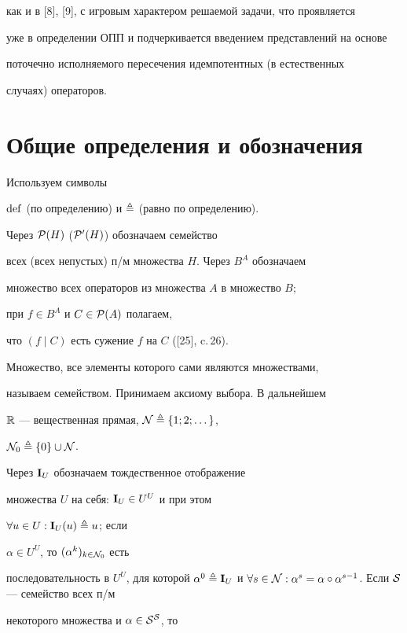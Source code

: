 как и в [8], [9], с игровым характером решаемой задачи, что проявляется


уже в определении ОПП и подчеркивается введением представлений на основе


поточечно исполняемого пересечения идемпотентных (в естественных


случаях) операторов.





\section{Общие определения и обозначения}





Используем символы


$\operatorname{def}$ (по определению) и $\triangleq$ (равно по определению).


Через ${{\cal P}(H)}$ (${{\cal P}'(H)}$) обозначаем семейство


всех (всех непустых) п/м множества $H$. Через $B^A$ обозначаем


множество всех операторов из множества $A$ в множество $B$;


при $f \in {B^A}$ и $C \in {{\cal P}(A)}$ полагаем,


что $(f \mid C)$ есть сужение $f$ на $C$ ([25], c.\,26).


Множество, все элементы которого сами являются множествами,


называем семейством. Принимаем аксиому выбора. В дальнейшем


${\Bbb R}$ --- вещественная прямая, ${\cal N} \triangleq \{1;2;\dotsc\}$,


${{\cal N}_0} \triangleq \{0\} \cup {\cal N}$.


Через ${\bold I}_U$ обозначаем тождественное отображение


множества $U$ на себя: ${{\bold I}_U} \in {U^U}$ и при этом


$\forall{u} \in U:{{\bold I}_U}(u) \triangleq u$; если


$\alpha \in {U^U}$, то $({{\alpha}^k})_{k \in {{\cal N}_0}}$ есть


последовательность в $U^U$, для которой ${{\alpha}^0} \stac


{{\bold I}_U}$ и $\fo{s} \in {\cal N}:{{\alpha}^s} =


\alpha \circ {{\alpha}^{s-1}}$. Если ${\cal S}$ --- семейство всех п/м


некоторого множества и $\alpha \in {\cal S}^{\cal S}$, то


